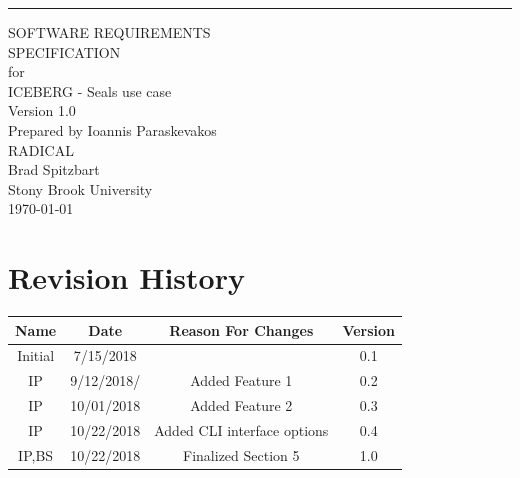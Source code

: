 \documentclass{scrreprt}
\date{}
\title{}
\def\myversion{1.0 }
\begin{document}
\begin{flushright}
    \rule{16cm}{5pt}\vskip1cm
    \begin{bfseries}
        \Huge{SOFTWARE REQUIREMENTS\\ SPECIFICATION}\\
        \vspace{1.9cm}
        for\\
        \vspace{1.9cm}
        ICEBERG - Seals use case\\
        \vspace{1.9cm}
        \LARGE{Version \myversion}\\
        \vspace{1.9cm}
        Prepared by Ioannis Paraskevakos\\
        RADICAL\\
	Brad Spitzbart\\
        Stony Brook University\\
        \vspace{1.9cm}
        \today\\
    \end{bfseries}
\end{flushright}

\tableofcontents


\chapter*{Revision History}

\begin{center}
    \begin{tabular}{|c|c|c|c|}
        \hline
        Name & Date & Reason For Changes & Version\\\hline
        Initial & 7/15/2018 & & 0.1\\\hline
        IP & 9/12/2018/ & Added Feature 1 & 0.2\\\hline
        IP & 10/01/2018 & Added Feature 2 & 0.3\\\hline
        IP & 10/22/2018 & Added CLI interface options & 0.4\\\hline
        IP,BS & 10/22/2018 & Finalized Section 5 & 1.0 \\\hline
    \end{tabular}
\end{center}
\end{document}
